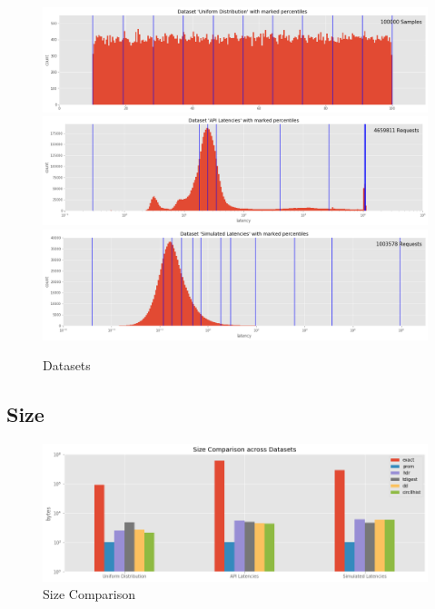 \documentclass{article}
\theoremstyle{plain}
\theoremstyle{remark}
\begin{document}
\begin{figure}
   \includegraphics[width=\textwidth]{evaluation/images/Uniform_Distribution_distribution_percentiles.png}
   \includegraphics[width=\textwidth]{evaluation/images/API_Latencies_distribution_percentiles.png}
   \includegraphics[width=\textwidth]{evaluation/images/Simulated_Latencies_distribution_percentiles.png}
   \caption{Datasets}
\end{figure}

\clearpage
\subsection{Size}

\begin{figure}[t!]
  \includegraphics[width=\textwidth]{evaluation/images/all_size.png}
  \caption{Size Comparison}
\end{figure}
\end{document}
